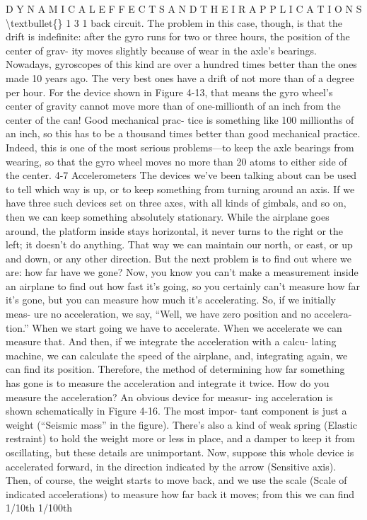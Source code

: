 \documentclass[10pt,oneside]{article}
\begin{document}
D Y N A M I C A L  E F F E C T S  A N D  T H E I R  A P P L I C A T I O N S \textbackslash{}textbullet\{\} 1 3 1 back circuit. The problem in this case, though, is that the drift is indefinite: after the gyro runs for two or three hours, the position of the center of grav- ity moves slightly because of wear in the axle’s bearings. Nowadays, gyroscopes of this kind are over a hundred times better than the ones made 10 years ago. The very best ones have a drift of not more than of a degree per hour. For the device shown in Figure 4-13, that means the gyro wheel’s center of gravity cannot move more than of one-millionth of an inch from the center of the can! Good mechanical prac- tice is something like 100 millionths of an inch, so this has to be a thousand times better than good mechanical practice. Indeed, this is one of the most serious problems---to keep the axle bearings from wearing, so that the gyro wheel moves no more than 20 atoms to either side of the center. 4-7 Accelerometers The devices we’ve been talking about can be used to tell which way is up, or to keep something from turning around an axis. If we have three such devices set on three axes, with all kinds of gimbals, and so on, then we can keep something absolutely stationary. While the airplane goes around, the platform inside stays horizontal, it never turns to the right or the left; it doesn’t do anything. That way we can maintain our north, or east, or up and down, or any other direction. But the next problem is to find out where we are: how far have we gone? Now, you know you can’t make a measurement inside an airplane to find out how fast it’s going, so you certainly can’t measure how far it’s gone, but you can measure how much it’s accelerating. So, if we initially meas- ure no acceleration, we say, “Well, we have zero position and no accelera- tion.” When we start going we have to accelerate. When we accelerate we can measure that. And then, if we integrate the acceleration with a calcu- lating machine, we can calculate the speed of the airplane, and, integrating again, we can find its position. Therefore, the method of determining how far something has gone is to measure the acceleration and integrate it twice. How do you measure the acceleration? An obvious device for measur- ing acceleration is shown schematically in Figure 4-16. The most impor- tant component is just a weight (“Seismic mass” in the figure). There’s also a kind of weak spring (Elastic restraint) to hold the weight more or less in place, and a damper to keep it from oscillating, but these details are unimportant. Now, suppose this whole device is accelerated forward, in the direction indicated by the arrow (Sensitive axis). Then, of course, the weight starts to move back, and we use the scale (Scale of indicated accelerations) to measure how far back it moves; from this we can find 1/10th 1/100th\par
\end{document}
